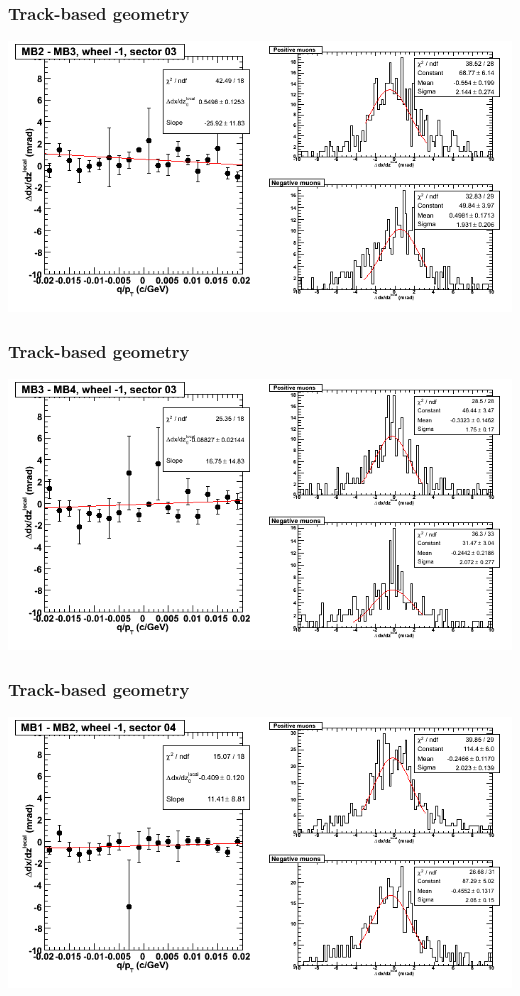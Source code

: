 \documentclass[compress]{beamer}
\begin{document}
\begin{frame}
\frametitle{Track-based geometry}
\includegraphics[width=\linewidth]{NOV4_segdiffs/dt13_slope_B_03_23.png}
\end{frame}

\begin{frame}
\frametitle{Track-based geometry}
\includegraphics[width=\linewidth]{NOV4_segdiffs/dt13_slope_B_03_34.png}
\end{frame}

\begin{frame}
\frametitle{Track-based geometry}
\includegraphics[width=\linewidth]{NOV4_segdiffs/dt13_slope_B_04_12.png}
\end{frame}
\end{document}
